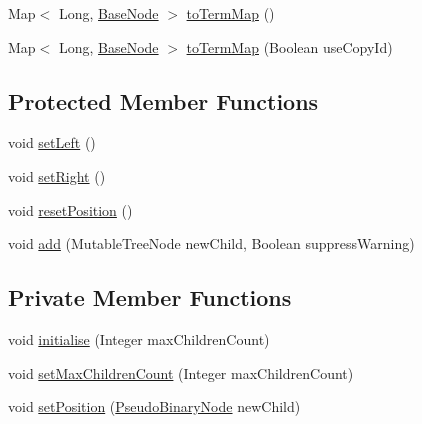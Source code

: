 \begin{DoxyCompactItemize}
\item 
Map$<$ Long, \hyperlink{classit_1_1emarolab_1_1cagg_1_1core_1_1BaseNode}{Base\-Node} $>$ \hyperlink{classit_1_1emarolab_1_1cagg_1_1core_1_1PseudoBinaryNode_af4549ee8c5fedd02712801634e478687}{to\-Term\-Map} ()
\item 
Map$<$ Long, \hyperlink{classit_1_1emarolab_1_1cagg_1_1core_1_1BaseNode}{Base\-Node} $>$ \hyperlink{classit_1_1emarolab_1_1cagg_1_1core_1_1PseudoBinaryNode_a3028b00984614eedb91557680ca1709e}{to\-Term\-Map} (Boolean use\-Copy\-Id)
\end{DoxyCompactItemize}
\subsection*{Protected Member Functions}
\begin{DoxyCompactItemize}
\item 
void \hyperlink{classit_1_1emarolab_1_1cagg_1_1core_1_1PseudoBinaryNode_ac54d17e09e34c1152aa96f0b21c99de4}{set\-Left} ()
\item 
void \hyperlink{classit_1_1emarolab_1_1cagg_1_1core_1_1PseudoBinaryNode_afce9f0ec5531c185dac2eae56204aa8f}{set\-Right} ()
\item 
void \hyperlink{classit_1_1emarolab_1_1cagg_1_1core_1_1PseudoBinaryNode_aaa0e29dbbf1bfbca16d9ee5e4dedd03f}{reset\-Position} ()
\item 
void \hyperlink{classit_1_1emarolab_1_1cagg_1_1core_1_1PseudoBinaryNode_ad34b23bd6a0fc0ab72082e2f7e4ef141}{add} (Mutable\-Tree\-Node new\-Child, Boolean suppress\-Warning)
\end{DoxyCompactItemize}
\subsection*{Private Member Functions}
\begin{DoxyCompactItemize}
\item 
void \hyperlink{classit_1_1emarolab_1_1cagg_1_1core_1_1PseudoBinaryNode_ab009ca05f5a86f6627d9bf5eb9cd5abd}{initialise} (Integer max\-Children\-Count)
\item 
void \hyperlink{classit_1_1emarolab_1_1cagg_1_1core_1_1PseudoBinaryNode_a1b5efd4fae2ffe77a698f6adb7e880f5}{set\-Max\-Children\-Count} (Integer max\-Children\-Count)
\item 
void \hyperlink{classit_1_1emarolab_1_1cagg_1_1core_1_1PseudoBinaryNode_a9f732be9bb5bbb8455a1df5cdb596db2}{set\-Position} (\hyperlink{classit_1_1emarolab_1_1cagg_1_1core_1_1PseudoBinaryNode}{Pseudo\-Binary\-Node} new\-Child)
\end{DoxyCompactItemize}
